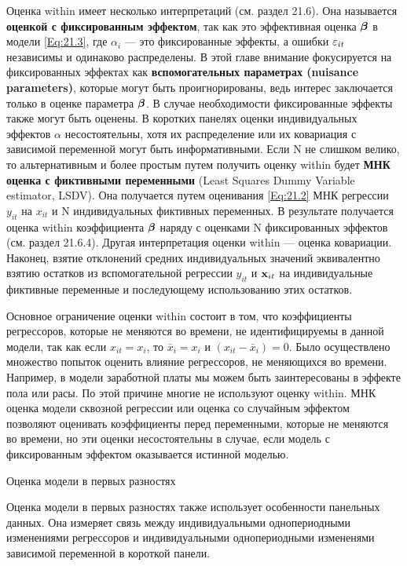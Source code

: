 Оценка within имеет несколько интерпретаций (см. раздел 21.6). Она называется \textbf{оценкой с фиксированным эффектом}, так как это эффективная оценка $\bm{\beta}$ в модели \ref{Eq:21.3}, где $\alpha_i$ --- это фиксированные эффекты, а ошибки $\varepsilon_{it}$ независимы и одинаково распределены. В этой главе внимание фокусируется на фиксированных эффектах как \textbf{вспомогательных параметрах (nuisance parameters)}, которые могут быть проигнорированы, ведь интерес заключается только в оценке параметра $\bm{\beta}$. В случае необходимости фиксированные эффекты также могут быть оценены. В коротких панелях  оценки индивидуальных эффектов $\alpha$ несостоятельны, хотя их распределение или их ковариация с зависимой переменной могут быть информативными. Если N не слишком велико, то альтернативным и более простым путем получить оценку within будет \textbf{МНК оценка с фиктивными переменными} (Least Squares Dummy Variable estimator, LSDV). Она получается путем оценивания \ref{Eq:21.2} МНК регрессии $y_{it}$ на $x_{it}$ и  N индивидуальных фиктивных переменных. В результате получается  оценка within коэффициента $\bm{\beta}$ наряду с оценками N фиксированных эффектов (см. раздел 21.6.4). Другая интерпретация оценки within --- оценка ковариации. Наконец, взятие отклонений средних индивидуальных значений эквивалентно взятию остатков из вспомогательной регрессии $y_{it}$ и $\mathbf{x}_{it}$ на индивидуальные фиктивные переменные и последующему использованию этих остатков.

Основное ограничение оценки within состоит в том, что коэффициенты регрессоров, которые не меняются во времени, не идентифицируемы в данной модели, так как если $x_{it}=x_i$, то $\bar{x}_i=x_i$ и $(x_{it}-\bar{x}_i)=0$. Было осуществлено множество попыток оценить влияние регрессоров, не меняющихся во времени. Например, в модели заработной платы мы можем быть заинтересованы в эффекте пола или расы. По этой причине многие не используют оценку within. МНК оценка модели сквозной регрессии или оценка со случайным эффектом позволяют оценивать коэффициенты перед переменными, которые не меняются во времени, но эти оценки несостоятельны в случае, если модель с фиксированным эффектом оказывается истинной моделью.


{\centering
Оценка модели в первых разностях\\}

Оценка модели в первых разностях также использует особенности панельных данных. Она измеряет связь между индивидуальными однопериодными изменениями регрессоров и индивидуальными однопериодными измененями зависимой переменной в короткой панели.

